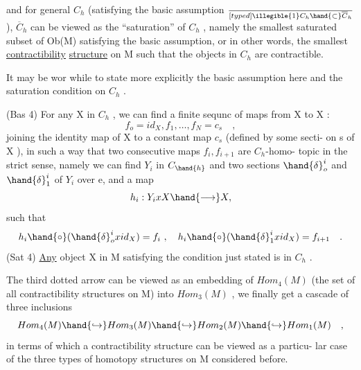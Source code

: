 and for general $C_h$ (satisfying the basic assumption $\over[typed]{\illegible{1}}{C}_h \hand{\subset} \overline{C}_h$), $\overline{C}_h$ can be
viewed as the ``saturation'' of $C_h$ , namely the smallest saturated subset
of Ob(M) satisfying the basic assumption, or in other words, the
smallest \uline{contractibility} \uline{structure} on M\hand{,}  such that the objects
in $C_h$ are contractible.

It may be wor while to state more explicitly the basic assumption
here\hand{,} and the saturation condition on $C_h$ .

(Bas 4) For any X in $C_h$ , we can find a finite sequnc of maps
from X to X :
\[ f_o=id_X, f_1, \ldots, f_N=c_s \quad , \]
joining the identity map of X to a constant map $c_s$ (defined by some secti-%
on s of X ), in such a way that two consecutive maps $f_i,f_{i+1}$ are $C_h$-homo-%
topic in the strict sense\hand{\unsure{*}}, namely we can find $Y_i$ in $C_{\hand{h}}$ and two sections
$\hand{\delta}^i_o$ and $\hand{\delta}^i_1$ of $Y_i$ over e, and a map
\[ h_i : Y_i x X \hand{\longrightarrow} X , \]
such that
\[ h_i\hand{\circ}(\hand{\delta}^i_o x id_X) = f_i \ , \quad h_i\hand{\circ}(\hand{\delta}^i_1 x id_X) = f_{i+1} \quad . \]
(Sat 4)  \uline{Any} object X in M satisfying the condition just stated is
in $C_h$ .

The third dotted arrow can be viewed as  an embedding of $Hom_4(M)$
(the set of all contractibility structures on M) into $Hom_3(M)$ , we finally
get a cascade of three inclusions
\[ Hom_4(M) \hand{\hookrightarrow} Hom_3(M) \hand{\hookrightarrow} Hom_2(M) \hand{\hookrightarrow} Hom_1(M) \quad , \]
in terms of which a contractibility structure  can be viewed as a particu-%
lar case of  the three types of homotopy structures on M considered before.

